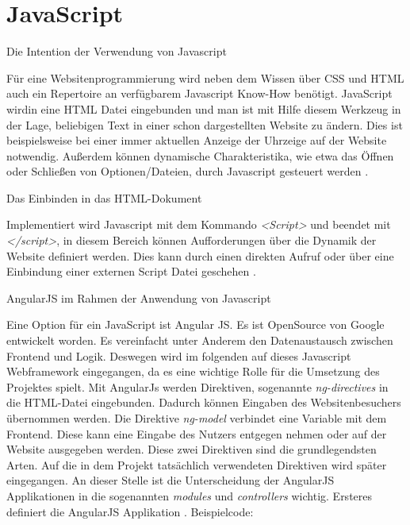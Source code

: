 \section{JavaScript}
\label{sec:JavaScript}

\begin{description}
	\item[ Die Intention der Verwendung von Javascript]
    \hfill
    \label{des:Intention_JS}
\end{description}
%
Für eine Websitenprogrammierung wird  neben dem Wissen über \ac{CSS} und \ac{HTML} auch ein Repertoire an verfügbarem Javascript Know-How benötigt. JavaScript wirdin eine \ac{HTML} Datei eingebunden und man ist mit Hilfe diesem Werkzeug in der Lage, beliebigen Text in einer schon dargestellten Website zu ändern. Dies ist beispielsweise bei einer immer aktuellen Anzeige der Uhrzeige auf der Website notwendig. Außerdem können dynamische Charakteristika, wie etwa das Öffnen oder Schließen von Optionen/Dateien, durch Javascript gesteuert werden \cite{javascript}.


\begin{description}
	\item[Das Einbinden in das \ac{HTML}-Dokument ]
	\hfill
    \label{des:Einbindung_JS}
\end{description}
%
Implementiert wird Javascript mit dem Kommando \textit{<Script>} und beendet mit \textit{</script>}, in diesem Bereich können Aufforderungen über die Dynamik der Website definiert werden. Dies kann durch einen direkten Aufruf oder über eine Einbindung einer externen Script Datei geschehen \cite{javascript}.


\newpage
\begin{description}
	\item[AngularJS im Rahmen der Anwendung von Javascript]
    \hfill
    \label{des:AngularJS}
\end{description}
%
Eine Option für ein JavaScript ist Angular JS. Es ist OpenSource von Google entwickelt worden. Es vereinfacht unter Anderem den Datenaustausch zwischen Frontend und Logik. Deswegen wird im folgenden auf dieses Javascript Webframework eingegangen, da es eine wichtige Rolle für die Umsetzung des Projektes spielt.
Mit AngularJs werden Direktiven, sogenannte \textit{ng-directives} in die \ac{HTML}-Datei eingebunden. Dadurch können Eingaben des Websitenbesuchers übernommen werden. Die Direktive \textit{ng-model} verbindet eine Variable mit dem Frontend. Diese kann eine Eingabe des Nutzers entgegen nehmen oder auf der Website ausgegeben werden. Diese zwei Direktiven sind die grundlegendsten Arten. Auf die in dem Projekt tatsächlich verwendeten Direktiven wird später eingegangen. 
An dieser Stelle ist die Unterscheidung der AngularJS Applikationen in die sogenannten \textit{modules} und \textit{controllers} wichtig. Ersteres definiert die AngularJS Applikation \cite{angularjs}.
\hfill
Beispielcode:


